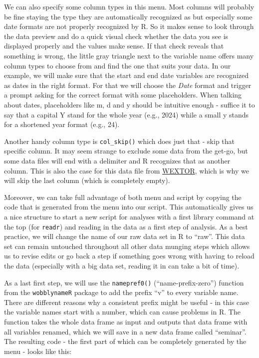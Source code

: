 \documentclass[
]{book}
\begin{document}
We can also specify some column types in this menu.
Most columns will probably be fine staying the type they are automatically recognized as but especially some date formats are not properly recognized by R.
So it makes sense to look through the data preview and do a quick visual check whether the data you see is displayed properly and the values make sense.
If that check reveals that something is wrong, the little gray triangle next to the variable name offers many column types to choose from and find the one that suits your data.
In our example, we will make sure that the start and end date variables are recognized as dates in the right format.
For that we will choose the \emph{Date} format and trigger a prompt asking for the correct format with some placeholders.
When talking about dates, placeholders like m, d and y should be intuitive enough - suffice it to say that a capital Y stand for the whole year (e.g., 2024) while a small y stands for a shortened year format (e.g., 24).

Another handy column type is \texttt{col\_skip()} which does just that - skip that specific column.
It may seem strange to exclude some data from the get-go, but some data files will end with a delimiter and R recognizes that as another column.
This is also the case for this data file from \href{https://www.wextor.eu}{WEXTOR}, which is why we will skip the last column (which is completely empty).

Moreover, we can take full advantage of both menu and script by copying the code that is generated from the menu into our script.
This automatically gives us a nice structure to start a new script for analyses with a first library command at the top (for \texttt{readr}) and reading in the data as a first step of analysis.
As a best practice, we will change the name of our raw data set in R to ``raw''.
This data set can remain untouched throughout all other data munging steps which allows us to revise edits or go back a step if something goes wrong with having to reload the data (especially with a big data set, reading it in can take a bit of time).

As a last first step, we will use the \texttt{namepref0()} (``name-prefix-zero'') function from the \texttt{wobblynameR} package to add the prefix ``v'' to every variable name.
There are different reasons why a consistent prefix might be useful - in this case the variable names start with a number, which can cause problems in R.
The function takes the whole data frame as input and outputs that data frame with all variables renamed, which we will save in a new data frame called ``seminar''.
The resulting code - the first part of which can be completely generated by the menu - looks like this:
\end{document}
